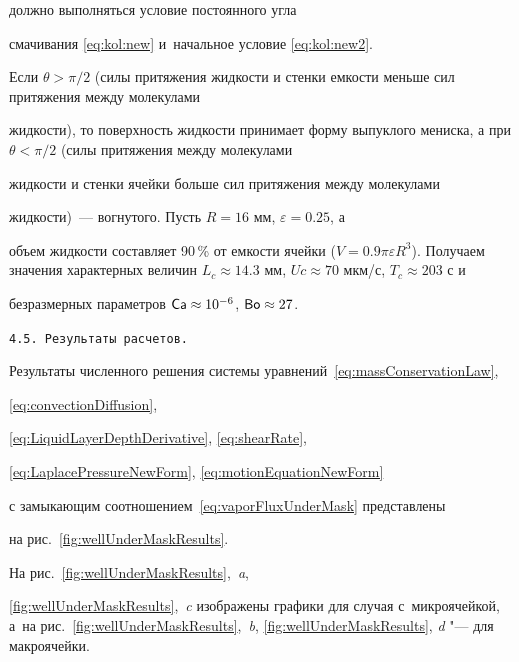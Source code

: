 должно выполняться условие постоянного угла

смачивания \eqref{eq:kol:new}  и~начальное  условие  \eqref{eq:kol:new2}. %

Если $\theta > \pi/2$  (силы притяжения жидкости и стенки емкости меньше сил притяжения между молекулами

жидкости), то поверхность жидкости принимает форму выпуклого мениска, а при $\theta < \pi/2$ (силы притяжения между молекулами

жидкости и стенки ячейки больше сил притяжения между молекулами

жидкости)~--- вогнутого. Пусть $R = 16$ мм, $\varepsilon  = 0.25$, а

объем жидкости составляет 90\,\% от емкости ячейки ($V = 0.9\pi

\varepsilon R^3$). Получаем значения характерных величин $L_c

\approx 14.3$ мм, $Uc \approx 70$ мкм/с, $T_c \approx 203$ с и

безразмерных параметров $\mathop{\mathsf{Ca}} \approx 10^{-6}$, $\mathop{\mathsf{Bo}} \approx 27$.



\smallskip



\texttt{4.5. Результаты расчетов.} 

Результаты численного решения системы уравнений~\eqref{eq:massConservationLaw},

\eqref{eq:convectionDiffusion},

\eqref{eq:LiquidLayerDepthDerivative}, \eqref{eq:shearRate},

\eqref{eq:LaplacePressureNewForm}, \eqref{eq:motionEquationNewForm}

с замыкающим соотношением~\eqref{eq:vaporFluxUnderMask} представлены

на рис.~\ref{fig:wellUnderMaskResults}. 

На рис.~\ref{fig:wellUnderMaskResults},~{\sl a}, 

\ref{fig:wellUnderMaskResults},~{\sl c} изображены графики для случая с~микроячейкой, а~на рис.~\ref{fig:wellUnderMaskResults},~{\sl b}, \ref{fig:wellUnderMaskResults}, {\sl d} "--- для макроячейки.









